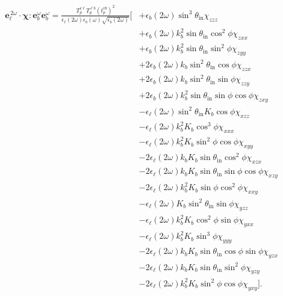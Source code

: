 \begin{equation*}
\begin{split}
\mathbf{e}^{\,2\omega}_{\ell}\cdot
\boldsymbol{\chi}:\mathbf{e}^{\omega}_{b}\mathbf{e}^{\omega}_{b} = 
\frac{T^{v\ell}_{p}T^{\ell b}_{p}\left(t^{vb}_{p}\right)^{2}}
     {\epsilon_{\ell}({2\omega})\epsilon_{b}(\omega)\sqrt{\epsilon_{b}(2\omega)}}
\bigg[
&+ \epsilon_{b}(2\omega)\sin^{3}\theta_{\mathrm{in}}\chi_{zzz}\\
&+ \epsilon_{b}(2\omega)k^{2}_{b}\sin\theta_{\mathrm{in}}\cos^{2}\phi\chi_{zxx}\\
&+ \epsilon_{b}(2\omega)k^{2}_{b}\sin\theta_{\mathrm{in}}\sin^{2}\phi\chi_{zyy}\\
&+ 2\epsilon_{b}(2\omega)k_{b}\sin^{2}\theta_{\mathrm{in}}\cos\phi\chi_{zzx}\\
&+ 2\epsilon_{b}(2\omega)k_{b}\sin^{2}\theta_{\mathrm{in}}\sin\phi\chi_{zzy}\\
&+ 2\epsilon_{b}(2\omega)k^{2}_{b}\sin\theta_{\mathrm{in}}\sin\phi\cos\phi\chi_{zxy}\\
&- \epsilon_{\ell}(2\omega)\sin^{2}\theta_{\mathrm{in}}K_{b}\cos\phi\chi_{xzz}\\
&- \epsilon_{\ell}(2\omega)k^{2}_{b}K_{b}\cos^{3}\phi\chi_{xxx}\\
&- \epsilon_{\ell}(2\omega)k^{2}_{b}K_{b}\sin^{2}\phi\cos\phi\chi_{xyy}\\
&- 2\epsilon_{\ell}(2\omega)k_{b}K_{b}\sin\theta_{\mathrm{in}}\cos^{2}\phi\chi_{xzx}\\
&- 2\epsilon_{\ell}(2\omega)k_{b}K_{b}\sin\theta_{\mathrm{in}}\sin\phi\cos\phi\chi_{xzy}\\
&- 2\epsilon_{\ell}(2\omega)k^{2}_{b}K_{b}\sin\phi\cos^{2}\phi\chi_{xxy}\\
&- \epsilon_{\ell}(2\omega)K_{b}\sin^{2}\theta_{\mathrm{in}}\sin\phi\chi_{yzz}\\
&- \epsilon_{\ell}(2\omega)k^{2}_{b}K_{b}\cos^{2}\phi\sin\phi\chi_{yxx}\\
&- \epsilon_{\ell}(2\omega)k^{2}_{b}K_{b}\sin^{3}\phi\chi_{yyy}\\
&- 2\epsilon_{\ell}(2\omega)k_{b}K_{b}\sin\theta_{\mathrm{in}}\cos\phi\sin\phi\chi_{yzx}\\
&- 2\epsilon_{\ell}(2\omega)k_{b}K_{b}\sin\theta_{\mathrm{in}}\sin^{2}\phi\chi_{yzy}\\
&- 2\epsilon_{\ell}(2\omega)k^{2}_{b}K_{b}\sin^{2}\phi\cos\phi\chi_{yxy}
\bigg].
\end{split}
\end{equation*}

